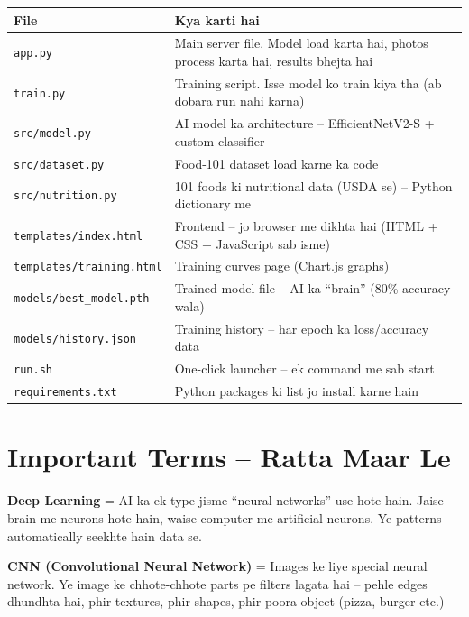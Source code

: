 \documentclass[11pt,a4paper]{article}
\begin{document}
\begin{tabularx}{\textwidth}{l X}
\toprule
\textbf{File} & \textbf{Kya karti hai} \\
\midrule
\texttt{app.py} & Main server file. Model load karta hai, photos process karta hai, results bhejta hai \\
\texttt{train.py} & Training script. Isse model ko train kiya tha (ab dobara run nahi karna) \\
\texttt{src/model.py} & AI model ka architecture -- EfficientNetV2-S + custom classifier \\
\texttt{src/dataset.py} & Food-101 dataset load karne ka code \\
\texttt{src/nutrition.py} & 101 foods ki nutritional data (USDA se) -- Python dictionary me \\
\texttt{templates/index.html} & Frontend -- jo browser me dikhta hai (HTML + CSS + JavaScript sab isme) \\
\texttt{templates/training.html} & Training curves page (Chart.js graphs) \\
\texttt{models/best\_model.pth} & Trained model file -- AI ka ``brain'' (80\% accuracy wala) \\
\texttt{models/history.json} & Training history -- har epoch ka loss/accuracy data \\
\texttt{run.sh} & One-click launcher -- ek command me sab start \\
\texttt{requirements.txt} & Python packages ki list jo install karne hain \\
\bottomrule
\end{tabularx}

\section{Important Terms -- Ratta Maar Le}

\begin{qabox}
\textbf{Deep Learning} = AI ka ek type jisme ``neural networks'' use hote hain. Jaise brain me neurons hote hain, waise computer me artificial neurons. Ye patterns automatically seekhte hain data se.
\end{qabox}
\vspace{0.2cm}

\begin{qabox}
\textbf{CNN (Convolutional Neural Network)} = Images ke liye special neural network. Ye image ke chhote-chhote parts pe filters lagata hai -- pehle edges dhundhta hai, phir textures, phir shapes, phir poora object (pizza, burger etc.)
\end{qabox}
\vspace{0.2cm}
\end{document}
